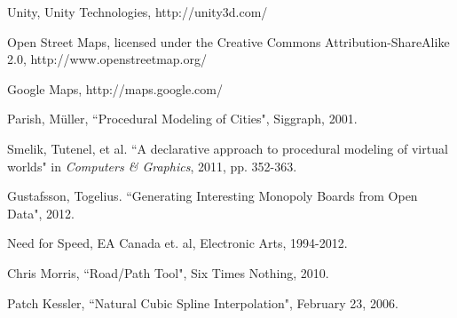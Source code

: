 \documentclass[conference]{IEEEtran}
\begin{document}
\begin{thebibliography}{6}
 Unity, Unity Technologies, http://unity3d.com/

 Open Street Maps, licensed under the Creative Commons Attribution-ShareAlike 2.0, http://www.openstreetmap.org/

 Google Maps, http://maps.google.com/

 Parish, Müller, ``Procedural Modeling of Cities", Siggraph, 2001.

Smelik, Tutenel, et al. ``A declarative approach to procedural modeling of virtual worlds" in \emph{Computers \& Graphics}, 2011, pp. 352-363.

 Gustafsson, Togelius. ``Generating Interesting Monopoly Boards from Open Data", 2012.

 Need for Speed, EA Canada et. al, Electronic Arts, 1994-2012.

 Chris Morris, ``Road/Path Tool",  Six Times Nothing, 2010.

 Patch Kessler, ``Natural Cubic Spline Interpolation", February 23, 2006.


\end{thebibliography}

\end{document}
